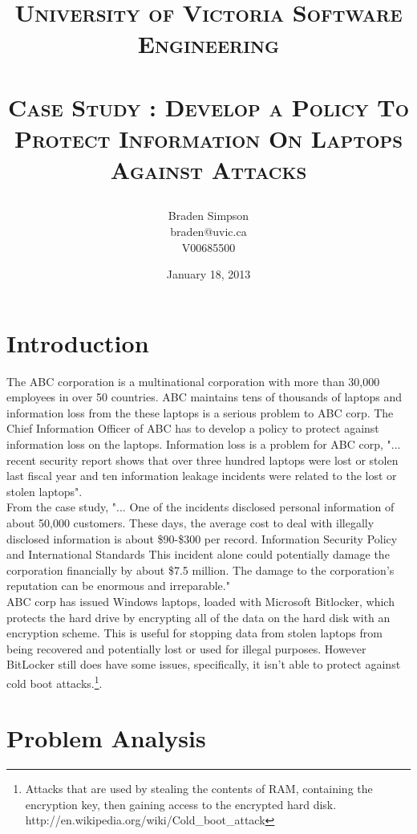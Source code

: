 \documentclass{article}
\title{
\large{\textsc{University of Victoria Software Engineering}}\huge\\ [0pt] %
\horrule{0.5pt}\\[0.4cm]
\textsc{Case Study : Develop a Policy To Protect Information On Laptops Against Attacks}\\
\author{Braden Simpson\\braden@uvic.ca\\V00685500}
\date{January 18, 2013}
}
\numberwithin{equation}{section} %
\numberwithin{figure}{section} %
\numberwithin{table}{section} %
\begin{document}
\maketitle %


\section{Introduction}
\label{sec:intro}

The ABC corporation is a multinational corporation with more than 30,000 employees in over 50 countries.  ABC maintains tens of thousands of laptops and information loss from the these laptops is a serious problem to ABC corp.  The Chief Information Officer of ABC has to develop a policy to protect against information loss on the laptops.  Information loss is a problem for ABC corp, "...  recent security report shows that over three 
hundred laptops were lost or stolen last fiscal year and ten information leakage incidents 
were related to the lost or stolen laptops".\\

From the case study, "... One of the incidents disclosed personal information of about 50,000 customers. These days, 
the average cost to deal with illegally disclosed information is about \$90-\$300 per record. Information Security Policy and International Standards This incident alone could potentially damage the corporation financially by about \$7.5 million. The damage to the corporation's reputation can be enormous and irreparable."\\  

ABC corp has issued Windows laptops, loaded with Microsoft Bitlocker, which protects the hard drive by encrypting all of the data on the hard disk with an encryption scheme.  This is useful for stopping data from stolen laptops from being recovered and potentially lost or used for illegal purposes.  However BitLocker still does have some issues, specifically, it isn't able to protect against cold boot attacks.\footnote{Attacks that are used by stealing the contents of RAM, containing the encryption key, then gaining access to the encrypted hard disk.  http://en.wikipedia.org/wiki/Cold\_boot\_attack}.\\

\section{Problem Analysis}
\label{sec:analysis}
\end{document}
